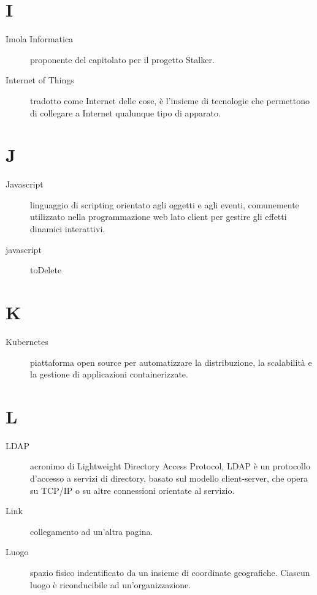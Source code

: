 \documentclass{article}
\begin{document}
	\section{I}
	\begin{description}
		\item[Imola Informatica] proponente del capitolato per il progetto Stalker.
		\item[Internet of Things] tradotto come Internet delle cose, è l'insieme di tecnologie che permettono di collegare a Internet qualunque tipo di apparato.
	\end{description}
	\section{J}
	\begin{description}
		\item[Javascript] linguaggio di scripting orientato agli oggetti e agli eventi, comunemente utilizzato nella programmazione web lato client per gestire gli effetti dinamici interattivi.
		\item[javascript] toDelete
	\end{description}
	\section{K}
	\begin{description}
		\item[Kubernetes] piattaforma open source per automatizzare la distribuzione, la scalabilità e la gestione di applicazioni containerizzate.
	\end{description}
	\section{L}
	\begin{description}
		\item[LDAP] acronimo di Lightweight Directory Access Protocol, LDAP è un protocollo d'accesso a servizi di directory, basato sul modello client-server, che opera su TCP/IP o su altre connessioni orientate al servizio.
		\item[Link] collegamento ad un'altra pagina.
		\item[Luogo] spazio fisico indentificato da un insieme di coordinate geografiche. Ciascun luogo è riconducibile ad un'organizzazione.
	\end{description}
\end{document}
